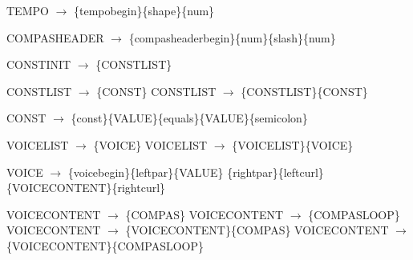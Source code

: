 TEMPO $\rightarrow$ \{tempobegin\}\{shape\}\{num\}\newline

COMPASHEADER $\rightarrow$ \{compasheaderbegin\}\{num\}\{slash\}\{num\}\newline

CONSTINIT $\rightarrow$ \{CONSTLIST\}\newline

CONSTLIST $\rightarrow$ \{CONST\}\newline
CONSTLIST $\rightarrow$ \{CONSTLIST\}\{CONST\}\newline

CONST $\rightarrow$ \{const\}\{VALUE\}\{equals\}\{VALUE\}\{semicolon\}\newline

VOICELIST $\rightarrow$ \{VOICE\}\newline
VOICELIST $\rightarrow$ \{VOICELIST\}\{VOICE\}\newline

VOICE $\rightarrow$ \{voicebegin\}\{leftpar\}\{VALUE\} \{rightpar\}\{leftcurl\}\{VOICECONTENT\}\{rightcurl\}\newline

VOICECONTENT $\rightarrow$ \{COMPAS\}\newline
VOICECONTENT $\rightarrow$ \{COMPASLOOP\}\newline
VOICECONTENT $\rightarrow$ \{VOICECONTENT\}\{COMPAS\}\newline
VOICECONTENT $\rightarrow$ \{VOICECONTENT\}\{COMPASLOOP\}\newline

